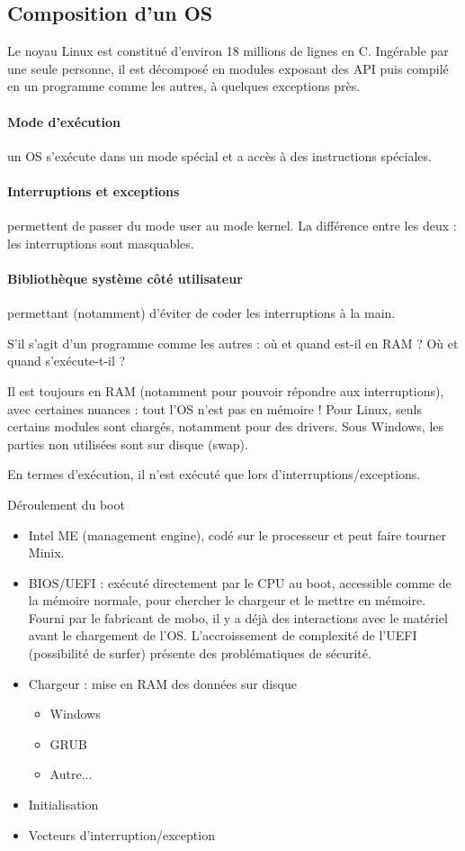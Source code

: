 \documentclass[11pt]{article}
\begin{document}
\subsection{Composition d'un OS}
Le noyau Linux est constitué d'environ 18 millions de lignes en C. Ingérable par une seule personne, il est décomposé en modules exposant des API puis compilé en un programme comme les autres, à quelques exceptions près.

\paragraph{Mode d'exécution} un OS s'exécute dans un mode spécial et a accès à des instructions spéciales.

\paragraph{Interruptions et exceptions} permettent de passer du mode user au mode kernel. La différence entre les deux : les interruptions sont masquables.

\paragraph{Bibliothèque système côté utilisateur} permettant (notamment) d'éviter de coder les interruptions à la main.

S'il s'agit d'un programme comme les autres : où et quand est-il en RAM ? Où et quand s'exécute-t-il ?

Il est toujours en RAM (notamment pour pouvoir répondre aux interruptions), avec certaines nuances : tout l'OS n'est pas en mémoire ! Pour Linux, seuls certains modules sont chargés, notamment pour des drivers. Sous Windows, les parties non utilisées sont sur disque (swap).

En termes d'exécution, il n'est exécuté que lors d'interruptions/exceptions.

Déroulement du boot
\begin{itemize}
	\item Intel ME (management engine), codé sur le processeur et peut faire tourner Minix.
	\item BIOS/UEFI : exécuté directement par le CPU au boot, accessible comme de la mémoire normale, pour chercher le chargeur et le mettre en mémoire. Fourni par le fabricant de mobo, il y a déjà des interactions avec le matériel avant le chargement de l'OS. L'accroissement de complexité de l'UEFI (possibilité de surfer) présente des problématiques de sécurité.
	\item Chargeur : mise en RAM des données sur disque \begin{itemize}
		      \item Windows
		      \item GRUB
		      \item Autre...
	      \end{itemize}
	\item Initialisation
	\item Vecteurs d'interruption/exception
\end{itemize}
\end{document}
